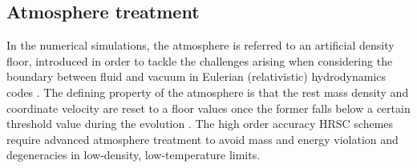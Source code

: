 %




\subsection{Atmosphere treatment}

In the numerical simulations, the atmosphere is referred to an artificial 
density floor, introduced in order to tackle the challenges arising when considering the  boundary between fluid and vacuum in Eulerian (relativistic) hydrodynamics codes
\citep{Galeazzi:mThesis:2008,Kastaun:2006,Millmore:2009dk,Radice:2013apa,Radice:2015nva}.
%
The defining property of the atmosphere is that the rest mass density and coordinate velocity are reset to a floor values once the former falls below a certain threshold value during the evolution \citep{Font:2001ew,Baiotti:2004wn}.
%
The high order accuracy \ac{HRSC} schemes require advanced atmosphere treatment to avoid 
mass and energy violation \cite{Radice:2011qr} and
degeneracies in low-density, low-temperature limits.


